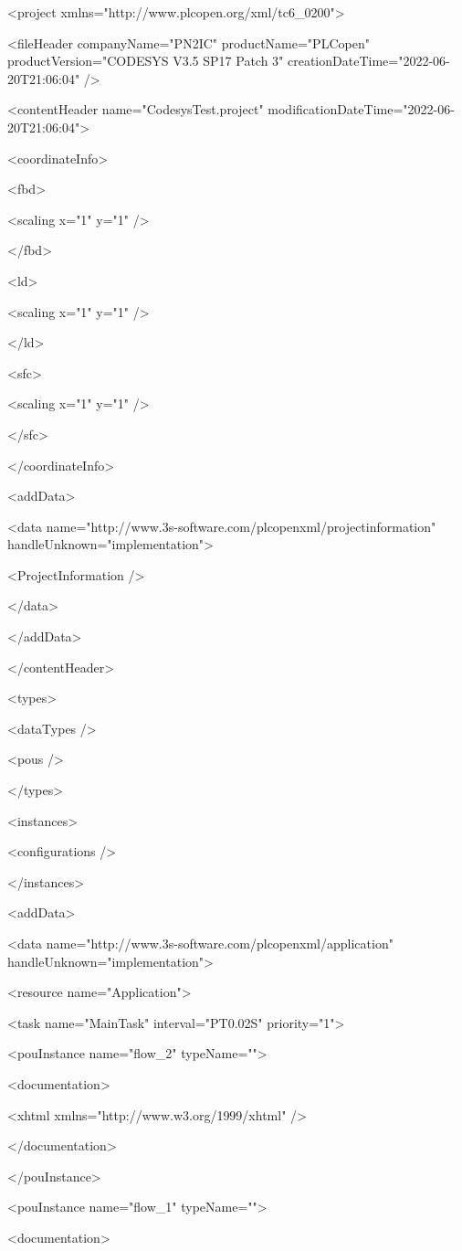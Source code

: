 {\setlength{\parindent}{0cm}
<project xmlns="http://www.plcopen.org/xml/tc6\_0200">

<fileHeader companyName="PN2IC" productName="PLCopen" productVersion="CODESYS V3.5 SP17 Patch 3" creationDateTime="2022-06-20T21:06:04" />

<contentHeader name="CodesysTest.project" modificationDateTime="2022-06-20T21:06:04">

<coordinateInfo>

<fbd>

<scaling x="1" y="1" />

</fbd>

<ld>

<scaling x="1" y="1" />

</ld>

<sfc>

<scaling x="1" y="1" />

</sfc>

</coordinateInfo>

<addData>

<data name="http://www.3s-software.com/plcopenxml/projectinformation" handleUnknown="implementation">

<ProjectInformation />

</data>

</addData>

</contentHeader>

<types>

<dataTypes />

<pous />

</types>

<instances>

<configurations />

</instances>

<addData>

<data name="http://www.3s-software.com/plcopenxml/application" handleUnknown="implementation">

<resource name="Application">

<task name="MainTask" interval="PT0.02S" priority="1">

<pouInstance name="flow\_2" typeName="">

<documentation>

<xhtml xmlns="http://www.w3.org/1999/xhtml" />

</documentation>

</pouInstance>

<pouInstance name="flow\_1" typeName="">

<documentation>

}
